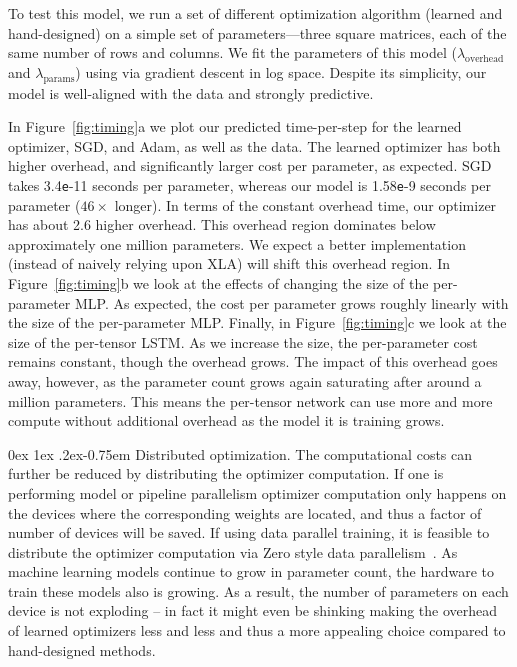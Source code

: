 \documentclass[11pt]{article}
\makeatletter
\renewcommand{\paragraph}{%
  \@startsection{paragraph}{4}%
  {\z@}{0ex \@plus 1ex \@minus .2ex}{-0.75em}%
  {\normalfont\normalsize\bfseries}%
}
\newcommand{\e}{\texttt{e}}
\makeatother
\begin{document}
To test this model, we run a set of different optimization algorithm (learned and hand-designed) on a simple set of parameters---three square matrices, each of the same number of rows and columns.
We fit the parameters of this model ($\lambda_{\text{overhead}}$ and $\lambda_{\text{params}}$) using via gradient descent in log space. Despite its simplicity, our model is well-aligned with the data and strongly predictive.

In Figure~\ref{fig:timing}a we plot our predicted time-per-step for the learned optimizer, SGD, and Adam, as well as the data.
The learned optimizer has both higher overhead, and significantly larger cost per parameter, as expected.
SGD takes 3.4\e-11 seconds per parameter, whereas our model is 1.58\e-9 seconds per parameter ($46\times$ longer).
In terms of the constant overhead time, our optimizer has about 2.6 higher overhead.
This overhead region dominates below approximately one million parameters.
We expect a better implementation (instead of naively relying upon XLA) will shift this overhead region.
In Figure~\ref{fig:timing}b we look at the effects of changing the size of the per-parameter MLP.
As expected, the cost per parameter grows roughly linearly with the size of the per-parameter MLP.
Finally, in Figure~\ref{fig:timing}c we look at the size of the per-tensor LSTM.
As we increase the size, the per-parameter cost remains constant, though the overhead grows.
The impact of this overhead goes away, however, as the parameter count grows again saturating after around a million parameters. This means the per-tensor network can use more and more compute without additional overhead as the model it is training grows.

\paragraph{Distributed optimization.}
The computational costs can further be reduced by distributing the optimizer computation.
If one is performing model or pipeline parallelism optimizer computation only happens on the devices where the corresponding weights are located, and thus a factor of number of devices will be saved.
If using data parallel training, it is feasible to distribute the optimizer computation via Zero style data parallelism~\citep{rajbhandari2020zero}.
As machine learning models continue to grow in parameter count, the hardware to train these models also is growing.
As a result, the number of parameters on each device is not exploding -- in fact it might even be shinking making the overhead of learned optimizers less and less and thus a more appealing choice compared to hand-designed methods.
\end{document}
